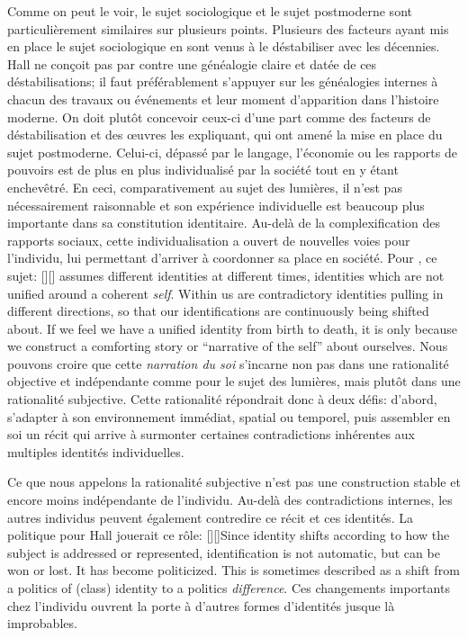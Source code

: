 Comme on peut le voir, le sujet sociologique et le sujet postmoderne sont particulièrement similaires sur plusieurs points.
Plusieurs des facteurs ayant mis en place le sujet sociologique en sont venus à le déstabiliser avec les décennies. 
Hall ne conçoit pas par contre une généalogie claire et datée de ces déstabilisations; il faut préférablement s'appuyer sur les généalogies internes à chacun des travaux ou événements et leur moment d'apparition dans l'histoire moderne.
On doit plutôt concevoir ceux-ci d'une part comme des facteurs de déstabilisation et des œuvres les expliquant, qui ont amené la mise en place du sujet postmoderne.
Celui-ci, dépassé par le langage, l'économie ou les rapports de pouvoirs est de plus en plus individualisé par la société tout en y étant enchevêtré.
En ceci, comparativement au sujet des lumières, il n'est pas nécessairement raisonnable et son expérience individuelle est beaucoup plus importante dans sa constitution identitaire.
Au-delà de la complexification des rapports sociaux, cette individualisation a ouvert de nouvelles voies pour l'individu, lui permettant d'arriver à coordonner sa place en société.
Pour \citeauthor{Hall1996a}, ce sujet: [{\citeyear[598]{Hall1996a}}][]{\textelp{} assumes different identities at different times, identities which are not unified around a coherent \emph{self}. Within us are contradictory identities pulling in different directions, so that our identifications are continuously being shifted about. If we feel we have a unified identity from birth to death, it is only because we construct a comforting story or ``narrative of the self'' about ourselves}.
Nous pouvons croire que cette \emph{narration du soi} s'incarne non pas dans une rationalité objective et indépendante comme pour le sujet des lumières, mais plutôt dans une rationalité subjective.
Cette rationalité répondrait donc à deux défis: d'abord, s'adapter à son environnement immédiat, spatial ou temporel, puis assembler en soi un récit qui arrive à surmonter certaines contradictions inhérentes aux multiples identités individuelles.

Ce que nous appelons la rationalité subjective n'est pas une construction stable et encore moins indépendante de l'individu.
Au-delà des contradictions internes, les autres individus peuvent également contredire ce récit et ces identités.
La politique pour Hall jouerait ce rôle: [{\citeyear[610]{Hall1996a}}][]{Since identity shifts according to how the subject is addressed or represented, identification is not automatic, but can be won or lost. It has become politicized. This is sometimes described as a shift from a politics of (class) identity to a politics \emph{difference}}.
Ces changements importants chez l'individu ouvrent la porte à d'autres formes d'identités jusque là improbables.

